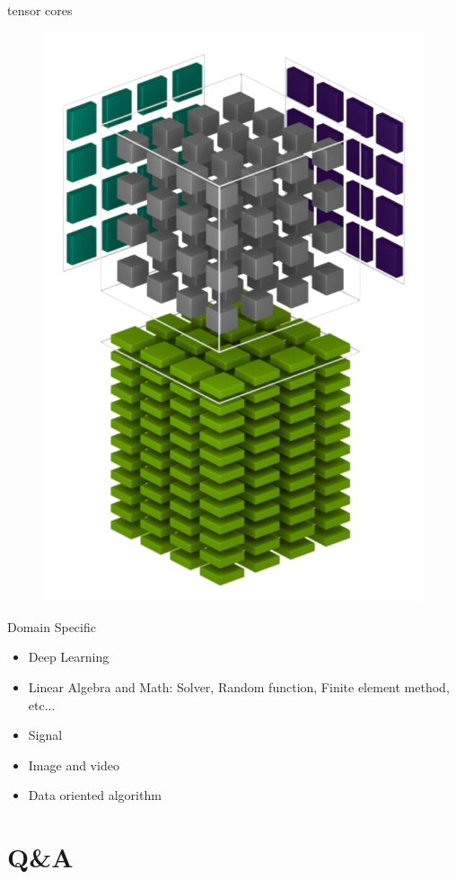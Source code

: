 \documentclass{beamer}
\begin{document}
\begin{frame}{tensor cores}
	\begin{figure}
		\includegraphics[scale=0.25]{figures/tensor.png}
	\end{figure}
\end{frame}

\begin{frame}{Domain Specific}
	\begin{itemize}
		\item Deep Learning
		\item Linear Algebra and Math: Solver, Random function, Finite element method, etc...
		\item Signal
		\item Image and video
		\item Data oriented algorithm
	\end{itemize}
\end{frame}

\section{Q\&A}
\end{document}
